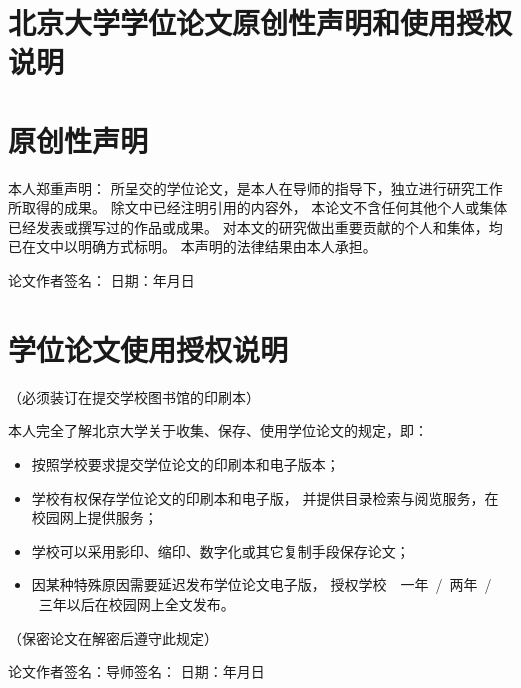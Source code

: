 \cleardoublepage
\section*{北京大学学位论文原创性声明和使用授权说明}
\vfill

\section*{原创性声明}

本人郑重声明：
所呈交的学位论文，是本人在导师的指导下，独立进行研究工作所取得的成果。
除文中已经注明引用的内容外，
本论文不含任何其他个人或集体已经发表或撰写过的作品或成果。
对本文的研究做出重要贡献的个人和集体，均已在文中以明确方式标明。
本声明的法律结果由本人承担。
\vspace{2.5em}\par

\rightline
{%
	论文作者签名：\hspace{5em}%
	日期：\hspace{2em}年\hspace{2em}月\hspace{2em}日%
}
\vfill

\section*{学位论文使用授权说明}
\vspace{-1em}\par
\centerline{（必须装订在提交学校图书馆的印刷本）}
\vspace{1em}\par

本人完全了解北京大学关于收集、保存、使用学位论文的规定，即：
\begin{itemize}\denselist
	\item 按照学校要求提交学位论文的印刷本和电子版本；
	\item 学校有权保存学位论文的印刷本和电子版，
		并提供目录检索与阅览服务，在校园网上提供服务；
	\item 学校可以采用影印、缩印、数字化或其它复制手段保存论文；
	\item 因某种特殊原因需要延迟发布学位论文电子版，
		授权学校~\Square~一年~/\Square~两年~/\\
		\Square~三年以后在校园网上全文发布。
\end{itemize}
\par（保密论文在解密后遵守此规定）
\vspace{2.5em}\par

\rightline
{%
	论文作者签名：\hspace{5em}导师签名：\hspace{5em}%
	日期：\hspace{2em}年\hspace{2em}月\hspace{2em}日%
}

